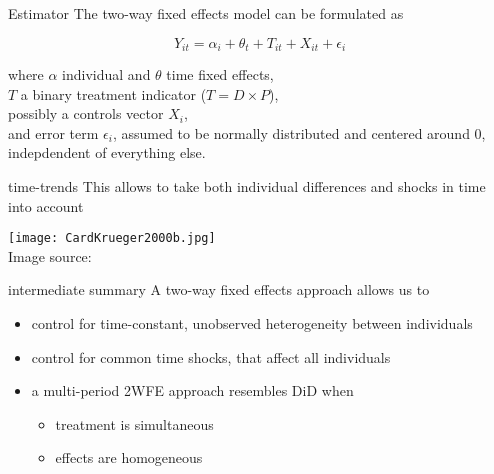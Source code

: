 \documentclass[aspectratio=169]{beamer}
\begin{document}
		\begin{frame}{Estimator}
			The two-way fixed effects model can be formulated as
			\\ \vspace*{.25cm}

			\begin{equation}
				Y_{it} = \alpha_i + \theta_t + T_{it} + X_{it} + \epsilon_i
			\end{equation}

			\vspace*{.25cm}
			where $\alpha$ individual and $\theta$ time fixed effects, \\
			$T$ a binary treatment indicator ($T=D \times P$), \\ possibly a controls vector $X_i$, \\
			and error term $\epsilon_i$, assumed to be normally distributed and centered around $0$, indepdendent of everything else.
		\end{frame}

		\begin{frame}{time-trends}
			This allows to take both individual differences and shocks in time into account
			\begin{center}
				\texttt{[image: CardKrueger2000b.jpg]}
				\\ \tiny{ Image source: \cite{Card2000}}
			\end{center}
		\end{frame}

		\begin{frame}{intermediate summary}
			A two-way fixed effects approach allows us to \\ \vspace*{.5cm}
			\begin{itemize}
				\item control for time-constant, unobserved heterogeneity between individuals
				\item control for common time shocks, that affect all individuals
				\item a multi-period 2WFE approach resembles DiD when
				\begin{itemize}
					\item treatment is simultaneous
					\item effects are homogeneous
				\end{itemize}
			\end{itemize}
		\end{frame}

\end{document}
